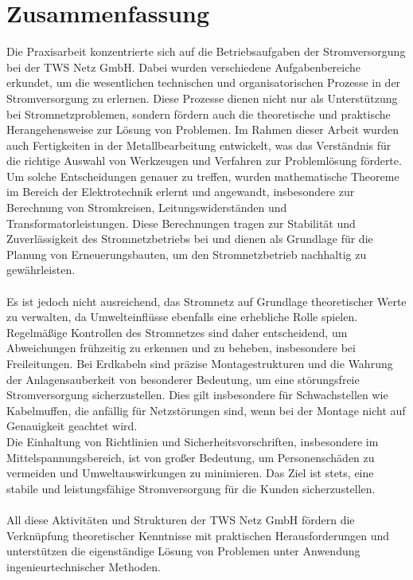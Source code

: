\chapter{Zusammenfassung}
\label{cha:zusammenfassung}

Die Praxisarbeit konzentrierte sich auf die Betriebsaufgaben der Stromversorgung bei der TWS Netz GmbH. Dabei wurden verschiedene Aufgabenbereiche erkundet, 
um die wesentlichen technischen und organisatorischen Prozesse in der Stromversorgung zu erlernen. Diese Prozesse dienen nicht nur als Unterstützung bei 
Stromnetzproblemen, sondern fördern auch die theoretische und praktische Herangehensweise zur Lösung von Problemen. Im Rahmen dieser Arbeit wurden auch 
Fertigkeiten in der Metallbearbeitung entwickelt, was das Verständnis für die richtige Auswahl von Werkzeugen und Verfahren zur Problemlösung förderte. 
Um solche Entscheidungen genauer zu treffen, wurden mathematische Theoreme im Bereich der Elektrotechnik erlernt und angewandt, insbesondere zur Berechnung von 
Stromkreisen, Leitungswiderständen und Transformatorleistungen. Diese Berechnungen tragen zur Stabilität und Zuverlässigkeit des Stromnetzbetriebs bei und 
dienen als Grundlage für die Planung von Erneuerungsbauten, um den Stromnetzbetrieb nachhaltig zu gewährleisten. 
\\\\
Es ist jedoch nicht ausreichend, das Stromnetz auf Grundlage theoretischer Werte zu verwalten, da Umwelteinflüsse ebenfalls eine erhebliche Rolle spielen. 
Regelmäßige Kontrollen des Stromnetzes sind daher entscheidend, um Abweichungen frühzeitig zu erkennen und zu beheben, insbesondere bei Freileitungen. Bei 
Erdkabeln sind präzise Montagestrukturen und die Wahrung der Anlagensauberkeit von besonderer Bedeutung, um eine störungsfreie Stromversorgung sicherzustellen. 
Dies gilt insbesondere für Schwachstellen wie Kabelmuffen, die anfällig für Netzstörungen sind, wenn bei der Montage nicht auf Genauigkeit geachtet wird. 
\\
Die Einhaltung von Richtlinien und Sicherheitsvorschriften, insbesondere im Mittelspannungsbereich, ist von großer Bedeutung, um Personenschäden zu vermeiden 
und Umweltauswirkungen zu minimieren. Das Ziel ist stets, eine stabile und leistungsfähige Stromversorgung für die Kunden sicherzustellen. 
\\\\
All diese Aktivitäten und Strukturen der TWS Netz GmbH fördern die Verknüpfung theoretischer Kenntnisse mit praktischen Herausforderungen und unterstützen 
die eigenständige Lösung von Problemen unter Anwendung ingenieurtechnischer Methoden.

\clearpage
